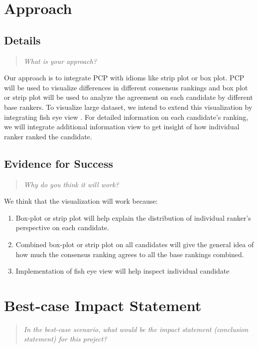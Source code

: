 \documentclass{proc}
\begin{document}
\section{Approach}
\subsection{Details}
\begin{quote}
\textit{What is your approach?}
\end{quote}

Our approach is to integrate PCP with idioms like strip plot or box plot. PCP will be used to visualize differences in different consensus rankings and box plot or strip plot will be used to analyze the agreement on each candidate by different base rankers. To visualize large dataset, we intend to extend this visualization by integrating fish eye view \cite{tominski2006fisheye}. For detailed information on each candidate's ranking, we will integrate additional information view to get insight of how individual ranker ranked the candidate.

\subsection{Evidence for Success}
\begin{quote}
\textit{Why do you think it will work?} 
\end{quote}

We think that the visualization will work because:
\begin{enumerate}
  \item Box-plot or strip plot will help explain the distribution of individual ranker's perspective on each candidate.
  \item Combined box-plot or strip plot on all candidates will give the general idea of how much the consensus ranking agrees to all the base rankings combined.
  \item Implementation of fish eye view will help inspect individual candidate
\end{enumerate}

\section{Best-case Impact Statement}
\begin{quote}
\textit{In the best-case scenario, what would be the impact statement (conclusion statement) for this project?}
\end{quote}
\end{document}
